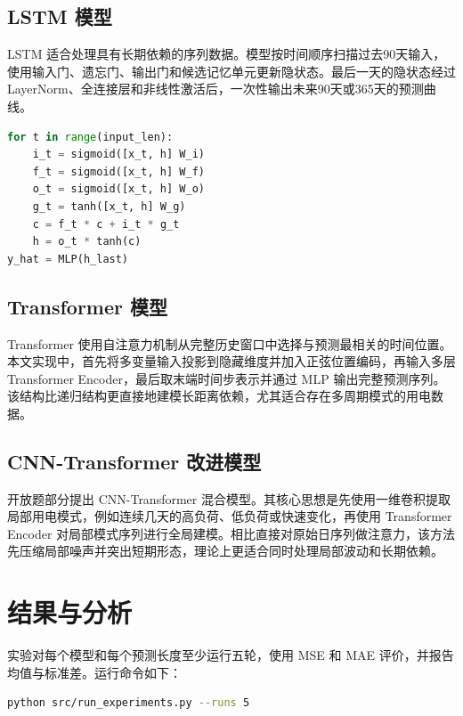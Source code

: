 \documentclass[UTF8,a4paper,12pt]{ctexart}
\begin{document}
\subsection{LSTM 模型}

LSTM 适合处理具有长期依赖的序列数据。模型按时间顺序扫描过去90天输入，使用输入门、遗忘门、输出门和候选记忆单元更新隐状态。最后一天的隐状态经过 LayerNorm、全连接层和非线性激活后，一次性输出未来90天或365天的预测曲线。

\begin{lstlisting}[language=Python,basicstyle=\small\ttfamily]
for t in range(input_len):
    i_t = sigmoid([x_t, h] W_i)
    f_t = sigmoid([x_t, h] W_f)
    o_t = sigmoid([x_t, h] W_o)
    g_t = tanh([x_t, h] W_g)
    c = f_t * c + i_t * g_t
    h = o_t * tanh(c)
y_hat = MLP(h_last)
\end{lstlisting}

\subsection{Transformer 模型}

Transformer 使用自注意力机制从完整历史窗口中选择与预测最相关的时间位置。本文实现中，首先将多变量输入投影到隐藏维度并加入正弦位置编码，再输入多层 Transformer Encoder，最后取末端时间步表示并通过 MLP 输出完整预测序列。该结构比递归结构更直接地建模长距离依赖，尤其适合存在多周期模式的用电数据。

\subsection{CNN-Transformer 改进模型}

开放题部分提出 CNN-Transformer 混合模型。其核心思想是先使用一维卷积提取局部用电模式，例如连续几天的高负荷、低负荷或快速变化，再使用 Transformer Encoder 对局部模式序列进行全局建模。相比直接对原始日序列做注意力，该方法先压缩局部噪声并突出短期形态，理论上更适合同时处理局部波动和长期依赖。

\section{结果与分析}

实验对每个模型和每个预测长度至少运行五轮，使用 MSE 和 MAE 评价，并报告均值与标准差。运行命令如下：

\begin{lstlisting}[language=bash,basicstyle=\small\ttfamily]
python src/run_experiments.py --runs 5
\end{lstlisting}
\end{document}
